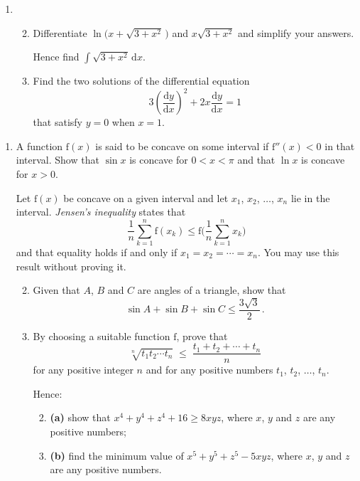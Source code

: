 \documentclass[a4, 11pt]{report}
\newlength{\qspace}
\newcounter{qnumber}
\newenvironment{question}%
 {\vspace{\qspace}
  \begin{enumerate}[\bfseries 1\quad][10]%
    \setcounter{enumi}{\value{qnumber}}%
    \item%
 }
{
  \end{enumerate}
  \filbreak
  \stepcounter{qnumber}
 }
\newenvironment{questionparts}[1][1]%
 {
  \begin{enumerate}[\bfseries (i)]%
    \setcounter{enumii}{#1}
    \addtocounter{enumii}{-1}
    \setlength{\itemsep}{5mm}
    \setlength{\parskip}{8pt}
 }
 {
  \end{enumerate}
 }
\def\d{{\mathrm d}}
\def\f{{\mathrm f}}
\def\le{\leqslant}
\def\ge{\geqslant}
\begin{document}
\begin{question}
\begin{questionparts}
\item  Differentiate $\ln\big (x+\sqrt{3+x^2}\,\big)$
and $x\sqrt{3+x^2}$ and simplify your answers.

Hence find
$\int \! \sqrt{3+x^2}\, \d x$.

\item  Find the two  solutions of the differential equation
\[
3\left(\frac{\d y}{\d x}\right)^{\!2} + 2 x \frac {\d y}{\d x} =1
\]
that satisfy $y=0$ when $x=1$.
\end{questionparts}
\end{question}
	
\begin{question}
A function $\f(x)$ is said to be concave on some interval if 
$\f''(x)<0$ in that interval. Show that 
$\sin x$ is concave for $0<x<\pi$ and
that $\ln x$ is concave for $x>0$.

Let $\f(x)$ be concave on a given  
interval and let $x_1$, $x_2$, $\ldots$, $x_n$ lie in the 
interval.
{\sl Jensen's inequality} states that
\[
\frac1 n \sum_{k=1}^n\f(x_k) \le \f \bigg (\frac1 n
\sum_{k=1}^n x_k\bigg)
\]
and that equality holds if and only if $x_1=x_2= \cdots =x_n$. You may
use this result without proving it.

\begin{questionparts}
\item 
Given that $A$, $B$ and $C$ are angles of a triangle, show that
\[
\sin A + \sin B + \sin C \le \frac{3\sqrt3}2 \,.
\]
\item 
By choosing a suitable function $\f$, prove that 
\[
\sqrt[n]{t_1t_2\cdots t_n}\; \le \; \frac{t_1+t_2+\cdots+t_n}n 
\]
for any positive integer $n$ and for any positive numbers $t_1$,
$t_2$,
$\ldots$, $t_n$. 

Hence:
\begin{questionparts}
\item[\bf (a)] show that 
$x^4+y^4+z^4 +16 \ge 8xyz$, where $x$, $y$ and $z$ are any 
positive numbers;

\item[\bf (b)] find the minimum value of  $x^5+y^5+z^5 -5xyz$, 
where $x$, $y$ and $z$ are any 
positive numbers.
\end{questionparts}

\end{questionparts}
\end{question}
		
\end{document}
